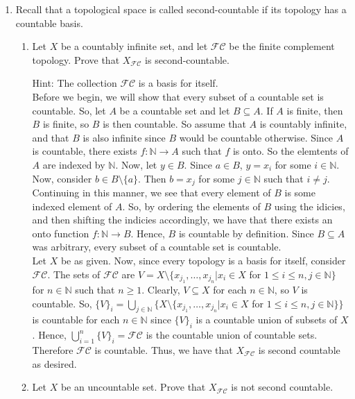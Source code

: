 \documentclass[12pt]{article}
\begin{document}
\begin{enumerate}
\item Recall that a topological space is called second-countable if its topology has a countable basis.
\begin{enumerate}
\item Let $X$ be a countably infinite set, and let $\mathcal{FC}$ be the finite complement topology. Prove that $X_{\mathcal{FC}}$ is second-countable.

Hint: The collection $\mathcal{FC}$ is a basis for itself.\\

Before we begin, we will show that every subset of a countable set is countable. So, let $A$ be a countable set and let $B\subseteq A$. If $A$ is finite, then $B$ is finite, so $B$ is then countable. So assume that $A$ is countably infinite, and that $B$ is also infinite since $B$ would be countable otherwise. Since $A$ is countable, there exists $f:\mathbb{N}\rightarrow A$ such that $f$ is onto. So the elemtents of $A$ are indexed by $\mathbb{N}$. Now, let $y\in B$. Since $a\in B$, $y=x_i$ for some $i\in\mathbb{N}$. Now, consider $b\in B\setminus\{a\}$. Then $b=x_j$ for some $j\in\mathbb{N}$ such that $i\neq j$. Continuing in this manner, we see that every element of $B$ is some indexed element of $A$. So, by ordering the elements of $B$ using the idicies, and then shifting the indicies accordingly, we have that there exists an onto function $f:\mathbb{N}\rightarrow B$. Hence, $B$ is countable by definition. Since $B\subseteq A$ was arbitrary, every subset of a countable set is countable.\\
Let $X$ be as given. Now, since every topology is a basis for itself, consider $\mathcal{FC}$. The sets of $\mathcal{FC}$ are $V=X\setminus\{x_{j_1},\ldots, x_{j_n}|x_i\in X$ for $1\leq i\leq n,j\in\mathbb{N}\}$ for $n\in\mathbb{N}$ such that $n\geq1$. Clearly, $V\subseteq X$ for each $n\in\mathbb{N}$, so $V$ is countable. So, $\{V\}_i=\bigcup_{j\in\mathbb{N}}\{X\setminus\{x_{j_1},\ldots, x_{j_n}|x_i\in X$ for $1\leq i\leq n, j\in\mathbb{N}\}\}$ is countable for each $n\in\mathbb{N}$ since $\{V\}_i$ is a countable union of subsets of $X$. Hence, $\bigcup_{i=1}^n\{V\}_i=\mathcal{FC}$ is the countable union of countable sets. Therefore $\mathcal{FC}$ is countable. Thus, we have that $X_{\mathcal{FC}}$ is second countable as desired.\\

\item Let $X$ be an uncountable set. Prove that $X_{\mathcal{FC}}$ is not second countable.


\end{enumerate}
\end{enumerate}
\end{document}
